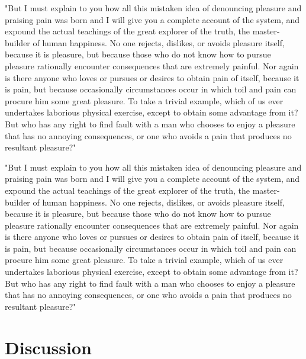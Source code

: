 \begin{refsection}
"But I must explain to you how all this mistaken idea of denouncing pleasure and praising pain was born and I will give you a complete account of the system, and expound the actual teachings of the great explorer of the truth, the master-builder of human happiness. No one rejects, dislikes, or avoids pleasure itself, because it is pleasure, but because those who do not know how to pursue pleasure rationally encounter consequences that are extremely painful. Nor again is there anyone who loves or pursues or desires to obtain pain of itself, because it is pain, but because occasionally circumstances occur in which toil and pain can procure him some great pleasure. To take a trivial example, which of us ever undertakes laborious physical exercise, except to obtain some advantage from it? But who has any right to find fault with a man who chooses to enjoy a pleasure that has no annoying consequences, or one who avoids a pain that produces no resultant pleasure?"

"But I must explain to you how all this mistaken idea of denouncing pleasure and praising pain was born and I will give you a complete account of the system, and expound the actual teachings of the great explorer of the truth, the master-builder of human happiness. No one rejects, dislikes, or avoids pleasure itself, because it is pleasure, but because those who do not know how to pursue pleasure rationally encounter consequences that are extremely painful. Nor again is there anyone who loves or pursues or desires to obtain pain of itself, because it is pain, but because occasionally circumstances occur in which toil and pain can procure him some great pleasure. To take a trivial example, which of us ever undertakes laborious physical exercise, except to obtain some advantage from it? But who has any right to find fault with a man who chooses to enjoy a pleasure that has no annoying consequences, or one who avoids a pain that produces no resultant pleasure?"


\section{Discussion}

\printbibliography[heading=subbibliography, title={References}] %
\end{refsection}
